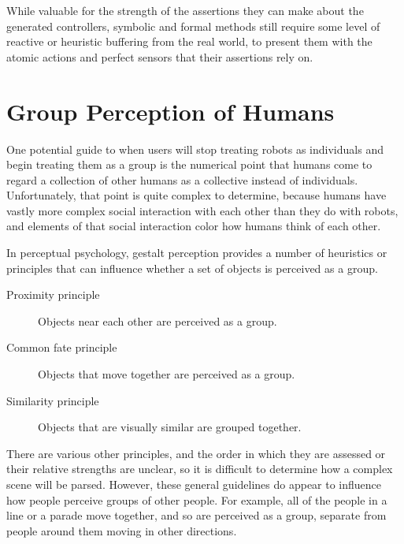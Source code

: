 While valuable for the strength of the assertions they can make about the generated controllers, symbolic and formal methods still require some level of reactive or heuristic buffering from the real world, to present them with the atomic actions and perfect sensors that their assertions rely on. 

\section{Group Perception of Humans}

One potential guide to when users will stop treating robots as individuals and begin treating them as a group is the numerical point that humans come to regard a collection of other humans as a collective instead of individuals. 
Unfortunately, that point is quite complex to determine, because humans have vastly more complex social interaction with each other than they do with robots, and elements of that social interaction color how humans think of each other. 

In perceptual psychology, gestalt perception provides a number of heuristics or principles that can influence whether a set of objects is perceived as a group. 
\begin{description}
\item[Proximity principle]
Objects near each other are perceived as a group.

\item[Common fate principle] 
Objects that move together are perceived as a group.

\item[Similarity principle]
Objects that are visually similar are grouped together.
\end{description}	

There are various other principles, and the order in which they are assessed or their relative strengths are unclear, so it is difficult to determine how a complex scene will be parsed. 
However, these general guidelines do appear to influence how people perceive groups of other people. For example, all of the people in a line or a parade move together, and so are perceived as a group, separate from people around them moving in other directions. 


